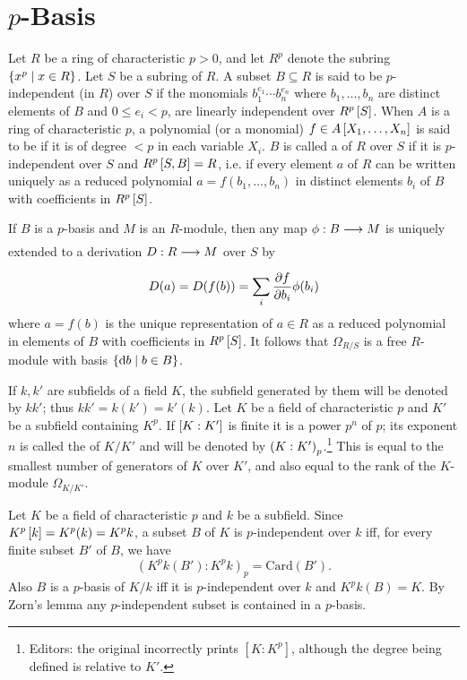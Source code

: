 \documentclass[../main]{subfiles}
\begin{document}
\section{\texorpdfstring{$p$}{p}-Basis}\label{sec:38}

\newparagraph
Let $R$ be a ring of characteristic $p > 0$, and let $R^p$ denote the subring $\left\{x^p \mid x \in R\right\}$. Let $S$ be a subring of $R$. A subset $B \subseteq R$ is said to be $p$-independent (in $R$) over $S$ if the monomials $b_1^{e_1}\cdots b_n^{e_n}$ where $b_1,\dots,b_n$ are distinct elements of $B$ and $0\le e_i < p$, are linearly independent over $R^p\left[S\right]$. When $A$ is a ring of characteristic $p$, a polynomial (or a monomial) $f \in A\left[X_1, \dots, X_n\right]$ is said to be  if it is of degree $< p$ in each variable $X_i$. $B$ is called a  of $R$ over $S$ if it is $p$-independent over $S$ and $R^p\left[S,B\right] = R$, i.e. if every element $a$ of $R$ can be written uniquely as a reduced polynomial $a = f(b_1, \dots, b_n)$ in distinct elements $b_i$ of $B$ with coefficients in $R^p\left[S\right]$.

If $B$ is a $p$-basis and $M$ is an $R$-module, then any map $\phi: B \varrightarrow{} M$ is uniquely extended to a derivation $D: R \varrightarrow{} M$ over $S$ by \[D(a) = D(f(b)) = \sum_i \dfrac{\partial f}{\partial b_i}\phi(b_i)\] where $a=f(b)$ is the unique representation of $a \in R$ as a reduced polynomial in elements of $B$ with coefficients in $R^p\left[S\right]$. It follows that $\Omega_{R/S}$ is a free $R$-module with basis $\left\{\mathrm{d}b\mid b\in B\right\}$. 

\newparagraph
If $k,k'$ are subfields of a field $K$, the subfield generated by them will be denoted by $kk'$; thus $kk' = k(k') = k'(k)$. Let $K$ be a field of characteristic $p$ and $K'$ be a subfield containing $K^p$. If $\left[K:K'\right]$ is finite it is a power $p^n$ of $p$; its exponent $n$ is called the  of $K/K'$ and will be denoted by $\left(K:K'\right)_p$.\footnote{Editors: the original incorrectly prints $[K:K^p]$, although the degree being defined is relative to $K'$.} This is equal to the smallest number of generators of $K$ over $K'$, and also equal to the rank of the $K$-module $\Omega_{K/K'}$.

Let $K$ be a field of characteristic $p$ and $k$ be a subfield. Since \newline $K^p\left[k\right] = K^p(k) = K^pk$, a subset $B$ of $K$ is $p$-independent over $k$ iff, for every finite subset $B'$ of $B$, we have \[(K^pk(B'):K^p k)_p = \mathrm{Card}(B').\] Also $B$ is a $p$-basis of $K/k$ iff it is $p$-independent over $k$ and $K^pk(B) =K$. By Zorn's lemma any $p$-independent subset is contained in a $p$-basis.
\end{document}
